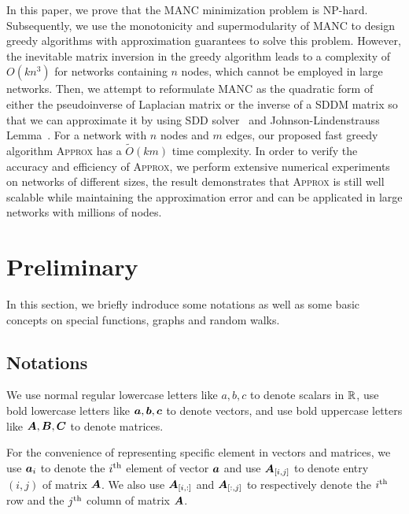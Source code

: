 \documentclass[sigconf]{acmart}
\begin{document}
In this paper, we prove that the MANC minimization problem is NP-hard.
Subsequently, we use the monotonicity and supermodularity of MANC to design greedy algorithms with approximation guarantees to solve this problem.
However, the inevitable matrix inversion in the greedy algorithm leads to a complexity of \(O(kn^3)\) for networks containing \(n\) nodes, which cannot be employed in large networks.
Then, we attempt to reformulate MANC as the quadratic form of either the pseudoinverse of Laplacian matrix or the inverse of a SDDM matrix so that we can approximate it by using SDD solver~\cite{CoKyMiPaJaPeRaXu14,SpTe14} and Johnson-Lindenstrauss Lemma~\cite{JoLi84}.
For a network with \(n\) nodes and \(m\) edges, our proposed fast greedy algorithm \textsc{Approx} has a \(\tilde{O}(km)\) time complexity.
In order to verify the accuracy and efficiency of \textsc{Approx}, we perform extensive numerical experiments on networks of different sizes, the result demonstrates that \textsc{Approx} is still well scalable while maintaining the approximation error and can be applicated in large networks with millions of nodes.



\section{Preliminary}\label{sec:prelim}

In this section, we briefly indroduce some notations as well as some basic concepts on special functions, graphs and random walks.

\subsection{Notations}

We use normal regular lowercase letters like \(a,b,c\) to denote scalars in \(\mathbb{R}\), use bold lowercase letters like \(\boldsymbol{a},\boldsymbol{b},\boldsymbol{c}\) to denote vectors, and use bold uppercase letters like \(\boldsymbol{A},\boldsymbol{B},\boldsymbol{C}\) to denote matrices.

For the convenience of representing specific element in vectors and matrices, we use \(\boldsymbol{a}_{i}\) to denote the \({i}^{\rm{th}}\) element of vector \(\boldsymbol{a}\) and use \(\boldsymbol{A}_{[i,j]}\) to denote entry \((i,j)\) of matrix \(\boldsymbol{A}\).
We also use \(\boldsymbol{A}_{[i,:]}\) and \(\boldsymbol{A}_{[:,j]}\) to respectively denote the \({i}^{\rm{th}}\) row and the \({j}^{\rm{th}}\) column of matrix \(\boldsymbol{A}\).
\end{document}
